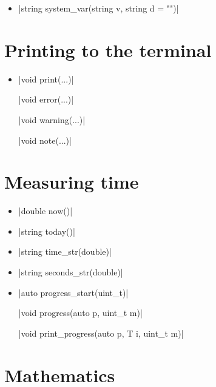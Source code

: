 \documentclass[12pt]{report}
\begin{document}
\begin{itemize}

\item \cppinline|string system_var(string v, string d = "")| 

\end{itemize}

\section{Printing to the terminal \label{SEC:support:print}}

\begin{itemize}

\item \cppinline|void print(...)| 

\cppinline|void error(...)| 

\cppinline|void warning(...)| 

\cppinline|void note(...)| 

\end{itemize}

\section{Measuring time \label{SEC:support:time}}

\begin{itemize}

\item \cppinline|double now()| 

\item \cppinline|string today()| 

\item \cppinline|string time_str(double)| 

\item \cppinline|string seconds_str(double)| 

\item \cppinline|auto progress_start(uint_t)| 

\cppinline|void progress(auto p, uint_t m)| 

\cppinline|void print_progress(auto p, T i, uint_t m)| 

\end{itemize}

\section{Mathematics \label{SEC:support:math}}
\end{document}

